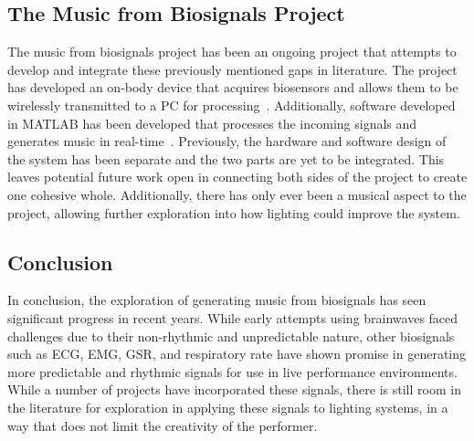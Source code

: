 \subsection{The Music from Biosignals Project}
The music from biosignals project has been an ongoing project that attempts to develop and integrate these previously mentioned gaps in literature.
The project has developed an on-body device that acquires biosensors and allows them to be wirelessly transmitted to a PC for processing~\cite{Pierro:2019}\cite{Tran:2022}.
Additionally, software developed in MATLAB has been developed that processes the incoming signals and generates music in real-time~\cite{Chen:2016}\cite{Nicholls:2019}.
Previously, the hardware and software design of the system has been separate and the two parts are yet to be integrated.
This leaves potential future work open in connecting both sides of the project to create one cohesive whole.
Additionally, there has only ever been a musical aspect to the project, allowing further exploration into how lighting could improve the system.

\subsection{Conclusion}
In conclusion, the exploration of generating music from biosignals has seen significant progress in recent years.
While early attempts using brainwaves faced challenges due to their non-rhythmic and unpredictable nature,
other biosignals such as ECG, EMG, GSR, and respiratory rate have shown promise in generating more predictable and rhythmic signals for use in live performance environments.
While a number of projects have incorporated these signals, there is still room in the literature for exploration in applying these signals to lighting systems, in a way that does not limit the creativity of the performer.
